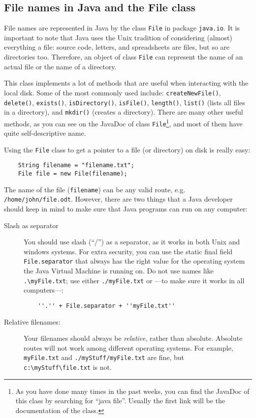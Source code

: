 \subsection{File names in Java and the File class}
\label{sec:files-java}

File names are represented in Java by the class \verb+File+ in package
\verb+java.io+. It is important to note that Java uses the Unix
tradition of considering (almost) everything a file: source code,
letters, and 
spreadsheets are files, but so are directories too. Therefore,
an object of class \verb+File+ can represent the name of an actual
file or the name of a directory.

This class implements a lot of methods that are useful when
interacting with the local disk. Some of the most commonly used
include: 
\verb+createNewFile()+, 
\verb+delete()+, 
\verb+exists()+, 
\verb+isDirectory()+, 
\verb+isFile()+, 
\verb+length()+, 
\verb+list()+ (lists all files in a directory), 
and
\verb+mkdir()+ (creates a directory). There are many other useful
methods, as you can see on the JavaDoc of class \verb+File+\footnote{As you
  have done many times in the past weeks, you can find the JavaDoc of
  this class by searching for ``java file''. Usually the first link
  will be the documentation of the class. }, and most of them have
quite self-descriptive name. 

Using the \verb+File+ class to get a pointer to a file (or directory)
on disk is really easy: 

\begin{verbatim}
    String filename = "filename.txt"; 
    File file = new File(filename);
\end{verbatim}

The name of the file (\verb+filename+) can be any valid route,
e.g. \verb+/home/john/file.odt+. However, there are two things that a
Java developer should keep in mind to make sure that Java programs can
run on any computer: 

\begin{description}
\item[Slash as separator] You should use slash (``/'') as a separator,
  as it works in both Unix and windows systems. For extra security,
  you can use the static final field \verb+File.separator+ that always
  has the right value for the operating system the Java Virtual
  Machine is running on. Do not use names like \verb+.\myFile.txt+;
  use either \verb+./myFile.txt+ or ---to make sure it works in all
  computers---:

\begin{verbatim}
    ''.'' + File.separator + ''myFile.txt''
\end{verbatim}

\item[Relative filenames: ] Your filenames should always be
  \emph{relative}, rather than absolute. Absolute routes will not work
  among different operating systems. For example, \verb+myFile.txt+ and
  \verb+./myStuff/myFile.txt+ are fine, but \verb+c:\myStuff\file.txt+
  is not. 
\end{description}

